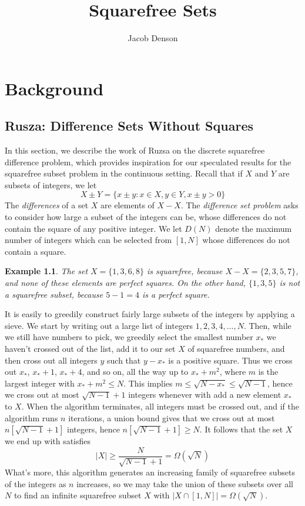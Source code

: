 \documentclass{report}
\title{Squarefree Sets}
\author{Jacob Denson}
\theoremstyle{plain}
\newtheorem*{example}{Example}
\theoremstyle{plain}
\begin{document}
\maketitle

\tableofcontents

\newpage

\chapter{Background}

\section{Rusza: Difference Sets Without Squares}

In this section, we describe the work of Ruzsa on the discrete squarefree difference problem, which provides inspiration for our speculated results for the squarefree subset problem in the continuous setting. Recall that if $X$ and $Y$ are subsets of integers, we let
%
\[ X \pm Y = \{ x \pm y: x \in X, y \in Y, x \pm y > 0 \} \]
%
The {\it differences} of a set $X$ are elements of $X - X$. The {\it difference set problem} asks to consider how large a subset of the integers can be, whose differences do not contain the square of any positive integer. We let $D(N)$ denote the maximum number of integers which can be selected from $[1,N]$ whose differences do not contain a square.

\begin{example}
    The set $X = \{ 1, 3, 6, 8 \}$ is squarefree, because $X - X = \{ 2, 3, 5, 7 \}$, and none of these elements are perfect squares. On the other hand, $\{ 1, 3, 5 \}$ is not a squarefree subset, because $5 - 1 = 4$ is a perfect square.
\end{example}

It is easily to greedily construct fairly large subsets of the integers by applying a sieve. We start by writing out a large list of integers $1,2,3,4,\dots,N$. Then, while we still have numbers to pick, we greedily select the smallest number $x_*$ we haven't crossed out of the list, add it to our set $X$ of squarefree numbers, and then cross out all integers $y$ such that $y - x_*$ is a positive square. Thus we cross out $x_*$, $x_* + 1$, $x_* + 4$, and so on, all the way up to $x_* + m^2$, where $m$ is the largest integer with $x_* + m^2 \leq N$. This implies $m \leq \sqrt{N - x_*} \leq \sqrt{N-1}$, hence we cross out at most $\sqrt{N-1} + 1$ integers whenever with add a new element $x_*$ to $X$. When the algorithm terminates, all integers must be crossed out, and if the algorithm runs $n$ iterations, a union bound gives that we cross out at most $n[\sqrt{N-1} + 1]$ integers, hence $n[\sqrt{N-1} + 1] \geq N$. It follows that the set $X$ we end up with satisfies
%
\[ |X| \geq \frac{N}{\sqrt{N-1} + 1} = \Omega(\sqrt{N}) \]
%
What's more, this algorithm generates an increasing family of squarefree subsets of the integers as $n$ increases, so we may take the union of these subsets over all $N$ to find an infinite squarefree subset $X$ with $|X \cap [1,N]| = \Omega(\sqrt{N})$.
\end{document}
